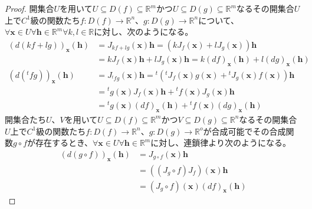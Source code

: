 \documentclass[dvipdfmx]{jsarticle}
\begin{document}
\begin{proof}
開集合$U$を用いて$U \subseteq D(f) \subseteq \mathbb{R}^{m}$かつ$U \subseteq D(g) \subseteq \mathbb{R}^{m}$なるその開集合$U$上で$C^{1}$級の関数たち$f:D(f) \rightarrow \mathbb{R}^{n}$、$g:D(g) \rightarrow \mathbb{R}^{n}$について、$\forall\mathbf{x} \in U\forall\mathbf{h} \in \mathbb{R}^{m}\forall k,l \in \mathbb{R}$に対し、次のようになる。
\begin{align*}
\left( d(kf + lg) \right)_{\mathbf{x}}\left( \mathbf{h} \right) &= J_{kf + lg}\left( \mathbf{x} \right)\mathbf{h} = \left( kJ_{f}\left( \mathbf{x} \right) + lJ_{g}\left( \mathbf{x} \right) \right)\mathbf{h}\\
&= kJ_{f}\left( \mathbf{x} \right)\mathbf{h} + lJ_{g}\left( \mathbf{x} \right)\mathbf{h} = k(df)_{\mathbf{x}}\left( \mathbf{h} \right) + l(dg)_{\mathbf{x}}\left( \mathbf{h} \right)\\
\left( d\left({}^{t}fg \right) \right)_{\mathbf{x}}\left( \mathbf{h} \right) &= J_{{}^{t}fg}\left( \mathbf{x} \right)\mathbf{h} ={}^{t}\left({}^{t}J_{f}\left( \mathbf{x} \right)g\left( \mathbf{x} \right) +{}^{t}J_{g}\left( \mathbf{x} \right)f\left( \mathbf{x} \right) \right)\mathbf{h}\\
&={}^{t}g\left( \mathbf{x} \right)J_{f}\left( \mathbf{x} \right)\mathbf{h} +{}^{t}f\left( \mathbf{x} \right)J_{g}\left( \mathbf{x} \right)\mathbf{h}\\
&={}^{t}g\left( \mathbf{x} \right)(df)_{\mathbf{x}}\left( \mathbf{h} \right) +{}^{t}f\left( \mathbf{x} \right)(dg)_{\mathbf{x}}\left( \mathbf{h} \right)
\end{align*}
開集合たち$U$、$V$を用いて$U \subseteq D(f) \subseteq \mathbb{R}^{m}$かつ$V \subseteq D(g) \subseteq \mathbb{R}^{n}$なるその開集合$U$上で$C^{1}$級の関数たち$f:D(f) \rightarrow \mathbb{R}^{n}$、$g:D(g) \rightarrow \mathbb{R}^{o}$が合成可能でその合成関数$g \circ f$が存在するとき、$\forall\mathbf{x} \in U\forall\mathbf{h} \in \mathbb{R}^{m}$に対し、連鎖律より次のようになる。
\begin{align*}
\left( d(g \circ f) \right)_{\mathbf{x}}\left( \mathbf{h} \right) &= J_{g \circ f}\left( \mathbf{x} \right)\mathbf{h}\\
&= \left( \left( J_{g} \circ f \right)J_{f} \right)\left( \mathbf{x} \right)\mathbf{h}\\
&= \left( J_{g} \circ f \right)\left( \mathbf{x} \right)(df)_{\mathbf{x}}\left( \mathbf{h} \right)
\end{align*}
\end{proof}
\end{document}
